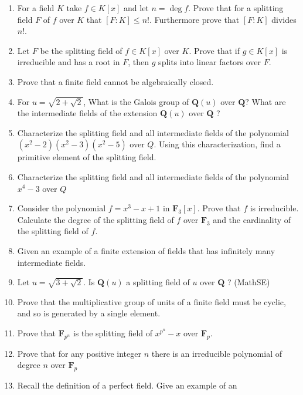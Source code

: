 \begin{enumerate}
\def\labelenumi{\arabic{enumi}.}
\setcounter{enumi}{8}
\tightlist
\item
  For a field \(K\) take \(f \in K[x]\) and let
  \(n=\operatorname{deg} f\). Prove that for a splitting field \(F\) of
  \(f\) over \(K\) that \([F: K] \leq n !\). Furthermore prove that
  \([F: K]\) divides \(n !\).
\item
  Let \(F\) be the splitting field of \(f \in K[x]\) over \(K\). Prove
  that if \(g \in K[x]\) is irreducible and has a root in \(F\), then
  \(g\) splits into linear factors over \(F\).
\item
  Prove that a finite field cannot be algebraically closed.
\item
  For \(u=\sqrt{2+\sqrt{2}}\), What is the Galois group of
  \(\boldsymbol{Q}(u)\) over \(\boldsymbol{Q} ?\) What are the
  intermediate fields of the extension \(\boldsymbol{Q}(u)\) over
  \(\boldsymbol{Q}\) ?
\item
  Characterize the splitting field and all intermediate fields of the
  polynomial
  \(\left(x^{2}-2\right)\left(x^{2}-3\right)\left(x^{2}-5\right)\) over
  \(Q\). Using this characterization, find a primitive element of the
  splitting field.
\item
  Characterize the splitting field and all intermediate fields of the
  polynomial \(x^{4}-3\) over \(Q\)
\item
  Consider the polynomial \(f=x^{3}-x+1\) in \(\boldsymbol{F}_{3}[x]\).
  Prove that \(f\) is irreducible. Calculate the degree of the splitting
  field of \(f\) over \(\boldsymbol{F}_{3}\) and the cardinality of the
  splitting field of \(f\).
\item
  Given an example of a finite extension of fields that has infinitely
  many intermediate fields.
\item
  Let \(u=\sqrt{3+\sqrt{2}}\). Is \(\boldsymbol{Q}(u)\) a splitting
  field of \(u\) over \(\boldsymbol{Q}\) ? (MathSE)
\item
  Prove that the multiplicative group of units of a finite field must be
  cyclic, and so is generated by a single element.
\item
  Prove that \(\boldsymbol{F}_{p^{n}}\) is the splitting field of
  \(x^{p^{n}}-x\) over \(\boldsymbol{F}_{p}\).
\item
  Prove that for any positive integer \(n\) there is an irreducible
  polynomial of degree \(n\) over \(\boldsymbol{F}_{p}\)
\item
  Recall the definition of a perfect field. Give an example of an

\end{enumerate}
